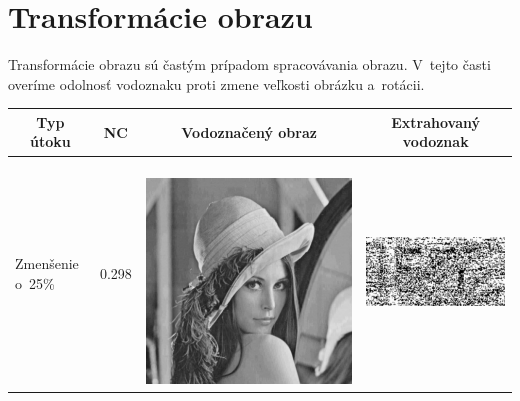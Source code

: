 \section{Transformácie obrazu} \label{transform}
Transformácie obrazu sú častým prípadom spracovávania obrazu. V~tejto časti overíme odolnosť vodoznaku proti zmene veľkosti obrázku a~rotácii.
\begin{table}[h]
\centering
\label{transform-table}
\begin{tabular}{llcc}
\hline
\multicolumn{1}{c}{\textbf{Typ útoku}} & \multicolumn{1}{c}{\textbf{NC}} & \multicolumn{1}{c}{\textbf{Vodoznačený obraz}} & \multicolumn{1}{c}{\textbf{Extrahovaný vodoznak}} \\ \hline
Zmenšenie o~25\%                       & 0.298 & 
\begin{minipage}[c]{.1\textwidth}
\ 
  \includegraphics[scale=0.1]{obrazky/scale75}
\end{minipage}
 &
 \begin{minipage}[c]{.15\textwidth}
   \includegraphics[scale=0.25]{obrazky/scale75-wm}

\end{minipage}
\end{tabular}
\end{table}
